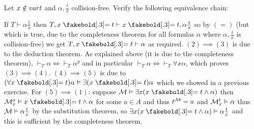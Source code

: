 \bexerc

    Let $x\notin{\sl var} t$ and $\alpha,\frac tx$ collision-free.
    Verify the following equivalence chain:


\eexerc

If $T\vdash\alpha\frac tx$ then $T,x\eq t\vdash x\eq t,\alpha\frac tx$ so by $(=)$ (but which is true, due to the completeness theorem for all formulas $\alpha$ where $\alpha,\frac tx$ is collision-free)
we get $T,x\eq t\vdash\alpha$ as required.
$(2)\implies(3)$ is due to the deduction theorem.
As explained above (it is due to the completeness theorem), $\vdash_T\alpha\iff\vdash_T\alpha^g$ and in particular $\vdash_T\alpha\iff\vdash_T\forall x\alpha$, which proves $(3)\implies(4)$.
$(4)\implies(5)$ is due to $(\forall x\eq t)\alpha\vDash\exists(x\eq t)\alpha$ which we showed in a previous exercise.
For $(5)\implies(1)$: suppose ${\cal M}\vDash\exists x(x\eq t\land\alpha)$ then ${\cal M}^a_x\vDash x\eq t\land\alpha$ for some $a\in A$ and thus $t^{\cal M}=a$ and ${\cal M}^t_x\vDash\alpha$ thus
${\cal M}\vDash\alpha\frac tx$ by the substitution theorem, so $\exists x(x\eq t\land\alpha)\vDash\alpha\frac tx$ and this is sufficient by the completeness theorem.

